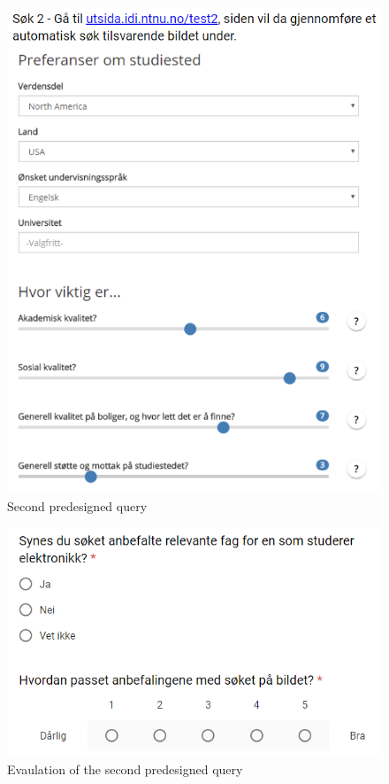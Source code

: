 \begin{figure}[h]
    \centering
    \includegraphics[width=1\textwidth]{fig/form2/s7_3.PNG}
    \caption{Second predesigned query}
    \label{fig:my_label}
\end{figure}
\begin{figure}[h]
    \centering
    \includegraphics[width=1\textwidth]{fig/form2/s7_4.PNG}
    \caption{Evaulation of the second predesigned query}
    \label{fig:my_label}
\end{figure}